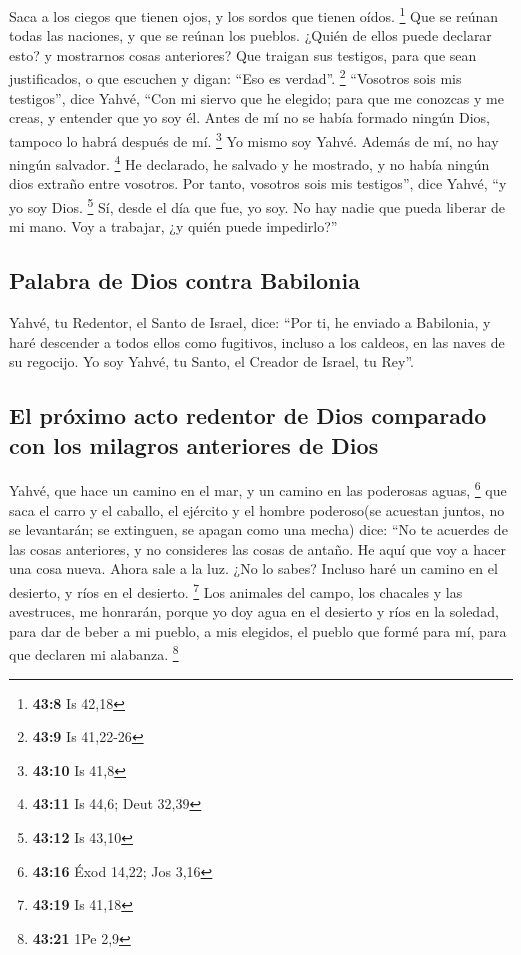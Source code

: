  Saca a los ciegos que tienen ojos, y los sordos que
tienen oídos. \footnote{\textbf{43:8} Is 42,18}  Que se
reúnan todas las naciones, y que se reúnan los pueblos. ¿Quién de ellos
puede declarar esto? y mostrarnos cosas anteriores? Que traigan sus
testigos, para que sean justificados, o que escuchen y digan: ``Eso es
verdad''. \footnote{\textbf{43:9} Is 41,22-26} 
``Vosotros sois mis testigos'', dice Yahvé, ``Con mi siervo que he
elegido; para que me conozcas y me creas, y entender que yo soy él.
Antes de mí no se había formado ningún Dios, tampoco lo habrá después de
mí. \footnote{\textbf{43:10} Is 41,8}  Yo mismo soy
Yahvé. Además de mí, no hay ningún salvador. \footnote{\textbf{43:11} Is
  44,6; Deut 32,39}  He declarado, he salvado y he
mostrado, y no había ningún dios extraño entre vosotros. Por tanto,
vosotros sois mis testigos'', dice Yahvé, ``y yo soy Dios. \footnote{\textbf{43:12}
  Is 43,10}  Sí, desde el día que fue, yo soy. No hay
nadie que pueda liberar de mi mano. Voy a trabajar, ¿y quién puede
impedirlo?''

\hypertarget{palabra-de-dios-contra-babilonia}{%
\subsection{Palabra de Dios contra
Babilonia}\label{palabra-de-dios-contra-babilonia}}

 Yahvé, tu Redentor, el Santo de Israel, dice: ``Por ti,
he enviado a Babilonia, y haré descender a todos ellos como fugitivos,
incluso a los caldeos, en las naves de su regocijo.  Yo
soy Yahvé, tu Santo, el Creador de Israel, tu Rey''.

\hypertarget{el-pruxf3ximo-acto-redentor-de-dios-comparado-con-los-milagros-anteriores-de-dios}{%
\subsection{El próximo acto redentor de Dios comparado con los milagros
anteriores de
Dios}\label{el-pruxf3ximo-acto-redentor-de-dios-comparado-con-los-milagros-anteriores-de-dios}}

 Yahvé, que hace un camino en el mar, y un camino en las
poderosas aguas, \footnote{\textbf{43:16} Éxod 14,22; Jos 3,16}
 que saca el carro y el caballo, el ejército y el hombre
poderoso(se acuestan juntos, no se levantarán; se extinguen, se apagan
como una mecha) dice:  ``No te acuerdes de las cosas
anteriores, y no consideres las cosas de antaño.  He aquí
que voy a hacer una cosa nueva. Ahora sale a la luz. ¿No lo sabes?
Incluso haré un camino en el desierto, y ríos en el desierto.
\footnote{\textbf{43:19} Is 41,18}  Los animales del
campo, los chacales y las avestruces, me honrarán, porque yo doy agua en
el desierto y ríos en la soledad, para dar de beber a mi pueblo, a mis
elegidos,  el pueblo que formé para mí, para que declaren
mi alabanza. \footnote{\textbf{43:21} 1Pe 2,9}

